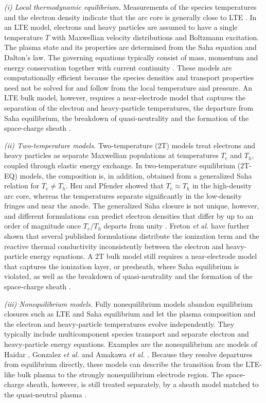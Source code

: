 \emph{(i) Local thermodynamic equilibrium.} Measurements of the species temperatures and the electron density indicate that the arc core is generally close to LTE \cite{pokrzywka1996spectroscopic,murphy1992laser,tanaka1999plasma}. In an LTE model, electrons and heavy particles are assumed to have a single temperature \(T\) with Maxwellian velocity distributions and Boltzmann excitation. The plasma state and its properties are determined from the Saha equation and Dalton's law. The governing equations typically consist of mass, momentum and energy conservation together with current continuity \cite{lago2004numerical,freton2000comparison,Hsu1983,korsipati2026fast}. These models are computationally efficient because the species densities and transport properties need not be solved for and follow from the local temperature and pressure. An LTE bulk model, however, requires a near-electrode model that captures the separation of the electron and heavy-particle temperatures, the departure from Saha equilibrium, the breakdown of quasi-neutrality and the formation of the space-charge sheath \cite{Almeida2008,almeida2009investigating,semenov2016numerical}.

\emph{(ii) Two-temperature models.} Two-temperature (2T) models treat electrons and heavy particles as separate Maxwellian populations at temperatures \(T_e\) and \(T_h\), coupled through elastic energy exchange. In two-temperature equilibrium (2T-EQ) models, the composition is, in addition, obtained from a generalized Saha relation for \(T_e\neq T_h\). Hsu and Pfender \cite{HsuPfender1983b} showed that \(T_e\approx T_h\) in the high-density arc core, whereas the temperatures separate significantly in the low-density fringes and near the anode. The generalized Saha closure is not unique, however, and different formulations can predict electron densities that differ by up to an order of magnitude once \(T_e/T_h\) departs from unity \cite{Rat2008}. Freton \textit{et al.} \cite{Freton2012} have further shown that several published formulations distribute the ionization term and the reactive thermal conductivity inconsistently between the electron and heavy-particle energy equations. A 2T bulk model still requires a near-electrode model that captures the ionization layer, or presheath, where Saha equilibrium is violated, as well as the breakdown of quasi-neutrality and the formation of the space-charge sheath \cite{benilov1995model,schmitz2002analysis}.

\emph{(iii) Nonequilibrium models.} Fully nonequilibrium models abandon equilibrium closures such as LTE and Saha equilibrium and let the plasma composition and the electron and heavy-particle temperatures evolve independently. They typically include multicomponent species transport and separate electron and heavy-particle energy equations. Examples are the nonequilibrium arc models of Haidar \cite{haidar1999non}, Gonzalez \textit{et al.} \cite{gonzalez2000decay} and Amakawa \textit{et al.} \cite{amakawa1998anode}. Because they resolve departures from equilibrium directly, these models can describe the transition from the LTE-like bulk plasma to the strongly nonequilibrium electrode region. The space-charge sheath, however, is still treated separately, by a sheath model matched to the quasi-neutral plasma \cite{baeva2016novel}.

